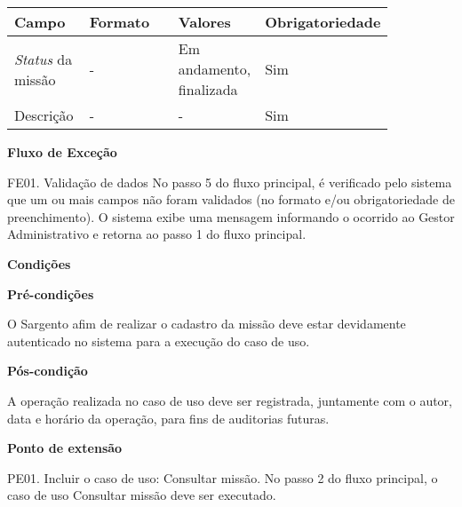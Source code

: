    \begin{table*}[!h]
    \centering
      \begin{tabular}{|p{0.20\linewidth}|p{0.25\linewidth}|p{0.20\linewidth}|p{0.20\linewidth}|}
      \hline
      Campo  & Formato & Valores & Obrigatoriedade\\
      \hline

      \textit{Status} da missão & - & Em andamento, finalizada & Sim\\\hline
      
      Descrição & - & - & Sim\\\hline
      
      \hline
      \end{tabular}
    \end{table*}

   {\raggedright
      \textbf{Fluxo de Exceção}
   }
   
   FE01. Validação de dados
	No passo 5 do fluxo principal, é verificado pelo sistema que um ou mais campos não foram validados (no formato e/ou
	obrigatoriedade de preenchimento). O sistema exibe uma mensagem informando o ocorrido ao Gestor Administrativo e retorna
	ao passo 1 do fluxo principal.

	
   {\raggedright
      \textbf{Condições}
   }
   
    
   \textbf{Pré-condições}
   
   O Sargento afim de realizar o cadastro da missão deve estar devidamente autenticado no sistema para a execução do caso de uso.

   \textbf{Pós-condição}
   
   A operação realizada no caso de uso deve ser registrada, juntamente com o autor, data e horário da operação, para fins de auditorias futuras.
   
   \textbf{Ponto de extensão}
   
   PE01. Incluir o caso de uso: Consultar missão.
   No passo 2 do fluxo principal, o caso de uso Consultar missão deve ser executado.
   
   \vfill
   \pagebreak